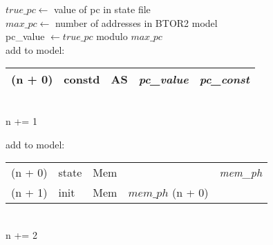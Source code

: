 \begin{algorithm}
    $true\_pc \leftarrow$ value of pc in state file\\
    $max\_pc \leftarrow$ number of addresses in BTOR2 model\\
    \textcolor{UniBlue}{pc\_value} $\leftarrow true\_pc$ modulo $max\_pc$\\
    add to model:\\
    \begin{tabular}[h]{>{\color{UniRed}}r l >{\color{UniGrey}}l l >{\itshape} l}
        \hline
        \ttfamily
        (n + 0) & constd & AS & \textcolor{UniBlue}{\rmfamily\textit{pc\_value}} & pc\_const \\
        \hline
    \end{tabular}\\
    \textcolor{UniRed}{n} += 1
    \BlankLine

    \BlankLine
    add to model:\\

    \begin{tabular}[h]{>{\ttfamily\color{UniRed}}r >{\ttfamily}l >{\ttfamily\color{UniGrey}}l >{\ttfamily}l >{\itshape} l}
        \hline
        (n + 0) & state & Mem &                                       & mem\_ph \\
        (n + 1) & init  & Mem & \textcolor{UniRed}{$mem\_ph$ (n + 0)} &         \\
        \hline
    \end{tabular}\\
    \textcolor{UniRed}{n} += 2\\


\end{algorithm}
